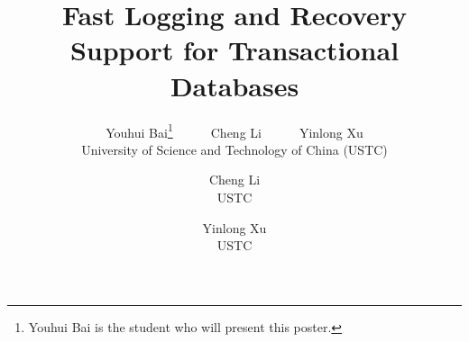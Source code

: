 \documentclass[letterpaper,twocolumn,10pt]{article}
\begin{document}
\date{}

\title{Fast Logging and Recovery Support for Transactional Databases}

\author{
{\rm Youhui Bai\thanks{Youhui Bai is the student who will present this poster.}\ \ \ \ \ \ Cheng Li\ \ \ \ \ \ Yinlong Xu}\\
University of Science and Technology of China (USTC)
\and
{\rm Cheng Li}\\
USTC
\and
{\rm Yinlong Xu}\\
USTC
\fi
}
\maketitle

\thispagestyle{empty}
% 




%

\begin{footnotesize}
%
\vspace{-.5em}


\end{footnotesize}
\end{document}
